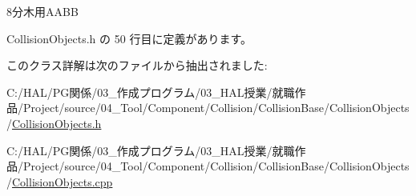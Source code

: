 8分木用\+A\+A\+BB 



 Collision\+Objects.\+h の 50 行目に定義があります。



このクラス詳解は次のファイルから抽出されました\+:\begin{DoxyCompactItemize}
\item 
C\+:/\+H\+A\+L/\+P\+G関係/03\+\_\+作成プログラム/03\+\_\+\+H\+A\+L授業/就職作品/\+Project/source/04\+\_\+\+Tool/\+Component/\+Collision/\+Collision\+Base/\+Collision\+Objects/\mbox{\hyperlink{_collision_objects_8h}{Collision\+Objects.\+h}}\item 
C\+:/\+H\+A\+L/\+P\+G関係/03\+\_\+作成プログラム/03\+\_\+\+H\+A\+L授業/就職作品/\+Project/source/04\+\_\+\+Tool/\+Component/\+Collision/\+Collision\+Base/\+Collision\+Objects/\mbox{\hyperlink{_collision_objects_8cpp}{Collision\+Objects.\+cpp}}\end{DoxyCompactItemize}
